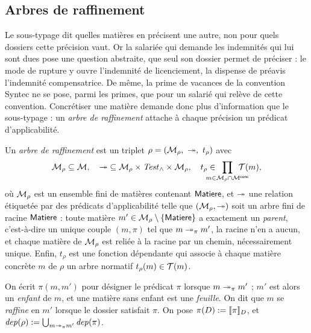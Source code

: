 \documentclass[review]{jflart}
\begin{document}
\subsection{Arbres de raffinement}\label{sec:hierarchie}

Le sous-typage dit quelles matières en précisent une autre, non pour quels
dossiers cette précision vaut. Or la salariée qui demande les indemnités qui lui sont dues pose une
question abstraite, que seul son dossier permet de préciser : le mode de rupture
y ouvre l'indemnité de licenciement, la dispense de préavis l'indemnité
compensatrice. De même, la prime de
vacances de la convention Syntec ne se pose, parmi les primes, que pour un
salarié qui relève de cette convention. Concrétiser une matière demande donc plus
d'information que le sous-typage : un \emph{arbre de raffinement} attache à
chaque précision un prédicat d'applicabilité.
\def\tree{t_\rho}
\begin{defi}\label{def:raffinement}
Un \emph{arbre de raffinement} est un triplet
\(
\rho=(\mc M_\rho,\ {\refine},\ \tree)
\) avec 
\[
\mc M_\rho\subseteq\mc M,\quad
{\refine}\subseteq \mc M_\rho\times\Pred\times \mc M_\rho,\quad
\tree\in\hspace{-0.5cm}\prod_{m\in\mc M_\rho\cap\CMatter}\hspace{-0.5cm} \mc T(m),
\]
où \(\mathcal{M}_\rho\) est un ensemble fini de matières contenant \(\mathsf{Matiere}\), et
\(\mathrel{\twoheadrightarrow}\) une relation étiquetée par des prédicats d'applicabilité telle que
\((\mathcal{M}_\rho,\mathrel{\twoheadrightarrow})\) soit un arbre fini de racine \(\mathsf{Matiere}\) : toute
matière \(m'\in\mathcal{M}_\rho\setminus\{\mathsf{Matiere}\}\) a exactement un \emph{parent},
c'est-à-dire un unique couple \((m,\pi)\) tel que \(m\mathrel{\twoheadrightarrow_{\pi}} m'\),
la racine n'en a aucun, et chaque matière de \(\mathcal{M}_\rho\) est reliée à la
racine par un chemin, nécessairement unique. Enfin, \(\tree\) est une fonction
dépendante qui associe à chaque matière concrète \(m\) de \(\rho\) un arbre
normatif \(\tree(m)\in\mc T(m)\).

On écrit \(\pi(m,m')\) pour désigner le prédicat $\pi$ lorsque \(m\mathrel{\twoheadrightarrow_{\pi}} m'\) ; \(m'\) est alors un
\emph{enfant} de \(m\), et une matière sans enfant est une \emph{feuille}. On
dit que \(m\) se \emph{raffine} en \(m'\) lorsque le dossier satisfait
\(\pi\). On pose \(\pi(D):=\llbracket \pi\rrbracket_D\), et
\(\mathit{dep}(\rho):=\bigcup_{m\mathrel{\twoheadrightarrow_{\pi}} m'}\mathit{dep}(\pi)\).
\end{defi}
\end{document}
